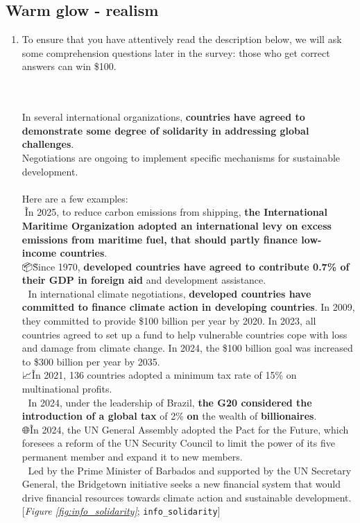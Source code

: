  \subsection*{Warm glow - realism} 
 \begin{enumerate}[resume] 
\item  \label{q:info_solidarity} To ensure that you have attentively read the description below, we will ask some comprehension questions later in the survey: those who get correct answers can win \$100.

\\\\In several international organizations, \textbf{countries have agreed to demonstrate some degree of solidarity in addressing global challenges}.\\
Negotiations are ongoing to implement specific mechanisms for sustainable development.\\\\Here are a few examples:\\🚢\~In 2025, to reduce carbon emissions from shipping, \textbf{the International Maritime Organization adopted an international levy on excess emissions from maritime fuel, that should partly finance low-income countries}.\\📦\~Since 1970, \textbf{developed countries have agreed to contribute 0.7\% of their GDP in foreign aid} and development assistance.\\
🌱 In international climate negotiations, \textbf{developed countries have committed to finance climate action in developing countries}. In 2009, they committed to provide \$100 billion per year by 2020. In 2023, all countries agreed to set up a fund to help vulnerable countries cope with loss and damage from climate change. In 2024, the \$100 billion goal was increased to \$300 billion per year by 2035.\\📈\~In 2021, 136 countries adopted a minimum tax rate of 15\% on multinational profits.\\💎 In 2024, under the leadership of Brazil, \textbf{the G20 considered the introduction of a global tax} of 2\% \textbf{on }the wealth of \textbf{billionaires}.
\\🌐\~In 2024, the UN General Assembly adopted the Pact for the Future, which foresees a reform of the UN Security Council to limit the power of its five permanent member and expand it to new members.\\🔄 Led by the Prime Minister of Barbados and supported by the UN Secretary General, the Bridgetown initiative seeks a new financial system that would drive financial resources towards climate action and sustainable development. [\textit{Figure \ref{fig:info_solidarity}}; 
\verb|info_solidarity|]



\end{enumerate}
